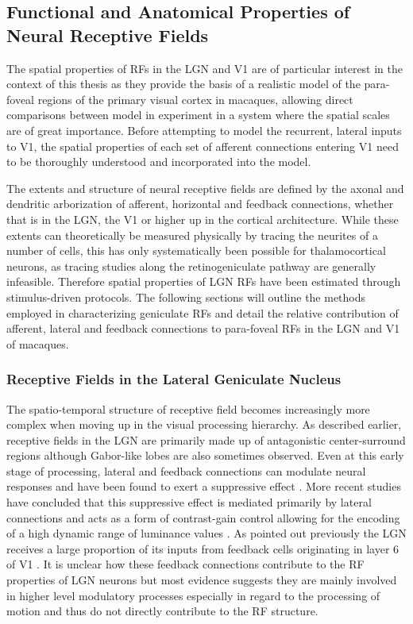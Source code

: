 \subsection{Functional and Anatomical Properties of Neural Receptive Fields}

The spatial properties of RFs in the LGN and V1 are of particular
interest in the context of this thesis as they provide the basis of a
realistic model of the para-foveal regions of the primary visual
cortex in macaques, allowing direct comparisons between model in
experiment in a system where the spatial scales are of great
importance. Before attempting to model the recurrent, lateral inputs
to V1, the spatial properties of each set of afferent connections
entering V1 need to be thoroughly understood and incorporated into the
model.

The extents and structure of neural receptive fields are defined by
the axonal and dendritic arborization of afferent, horizontal and
feedback connections, whether that is in the LGN, the V1 or higher up
in the cortical architecture. While these extents can theoretically be
measured physically by tracing the neurites of a number of cells, this
has only systematically been possible for thalamocortical
neurons, as tracing studies along the retinogeniculate
pathway are generally infeasible. Therefore spatial properties of LGN
RFs have been estimated through stimulus-driven protocols. The
following sections will outline the methods employed in characterizing
geniculate RFs and detail the relative contribution of afferent,
lateral and feedback connections to para-foveal RFs in the LGN and V1
of macaques.

\subsubsection{Receptive Fields in the Lateral Geniculate Nucleus}
\label{sec:LGNRF}


The spatio-temporal structure of receptive field becomes increasingly
more complex when moving up in the visual processing hierarchy. As
described earlier, receptive fields in the LGN are primarily made up
of antagonistic center-surround regions although Gabor-like lobes are
also sometimes observed. Even at this early stage of processing,
lateral and feedback connections can modulate neural responses and
have been found to exert a suppressive effect \citep{Hubel1961}. More
recent studies have concluded that this suppressive effect is mediated
primarily by lateral connections and acts as a form of contrast-gain
control allowing for the encoding of a high dynamic range of luminance
values \citep{Bonin2005}. As pointed out previously the LGN receives a
large proportion of its inputs from feedback cells originating in
layer 6 of V1 \citep{Sherman2002}. It is unclear how these feedback
connections contribute to the RF properties of LGN neurons but most
evidence suggests they are mainly involved in higher level modulatory
processes especially in regard to the processing of motion
\citep{Sillito2006} and thus do not directly contribute to the RF
structure.

